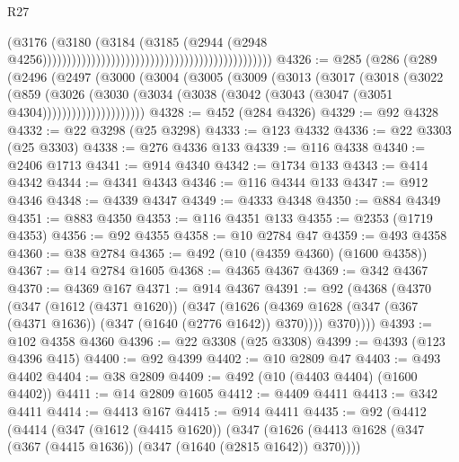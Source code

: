 \begin{lexlean}{R27}
\begin{coremodule}
                                                                                      (@3176
                                                                                        (@3180
                                                                                          (@3184
                                                                                            (@3185
                                                                                              (@2944
                                                                                                (@2948
                                                                                                  @4256)))))))))))))))))))))))))))))))))))))))))))))))
@4326 := @285
    (@286
      (@289
        (@2496
          (@2497
            (@3000
              (@3004
                (@3005
                  (@3009
                    (@3013
                      (@3017
                        (@3018
                          (@3022
                            (@859
                              (@3026
                                (@3030
                                  (@3034
                                    (@3038 (@3042 (@3043 (@3047 (@3051 @4304)))))))))))))))))))))
@4328 := @452 (@284 @4326)
@4329 := @92 @4328
@4332 := @22 @3298 (@25 @3298)
@4333 := @123 @4332
@4336 := @22 @3303 (@25 @3303)
@4338 := @276 @4336 @133
@4339 := @116 @4338
@4340 := @2406 @1713
@4341 := @914 @4340
@4342 := @1734 @133
@4343 := @414 @4342
@4344 := @4341 @4343
@4346 := @116 @4344 @133
@4347 := @912 @4346
@4348 := @4339 @4347
@4349 := @4333 @4348
@4350 := @884 @4349
@4351 := @883 @4350
@4353 := @116 @4351 @133
@4355 := @2353 (@1719 @4353)
@4356 := @92 @4355
@4358 := @10 @2784 @47
@4359 := @493 @4358
@4360 := @38 @2784
@4365 := @492 (@10 (@4359 @4360) (@1600 @4358))
@4367 := @14 @2784 @1605
@4368 := @4365 @4367
@4369 := @342 @4367
@4370 := @4369 @167
@4371 := @914 @4367
@4391 := @92
    (@4368
      (@4370
        (@347
          (@1612 (@4371 @1620))
          (@347
            (@1626 (@4369 @1628 (@347 (@367 (@4371 @1636)) (@347 (@1640 (@2776 @1642)) @370))))
            @370))))
@4393 := @102 @4358 @4360
@4396 := @22 @3308 (@25 @3308)
@4399 := @4393 (@123 @4396 @415)
@4400 := @92 @4399
@4402 := @10 @2809 @47
@4403 := @493 @4402
@4404 := @38 @2809
@4409 := @492 (@10 (@4403 @4404) (@1600 @4402))
@4411 := @14 @2809 @1605
@4412 := @4409 @4411
@4413 := @342 @4411
@4414 := @4413 @167
@4415 := @914 @4411
@4435 := @92
    (@4412
      (@4414
        (@347
          (@1612 (@4415 @1620))
          (@347
            (@1626 (@4413 @1628 (@347 (@367 (@4415 @1636)) (@347 (@1640 (@2815 @1642)) @370))))

\end{coremodule}
\end{lexlean}
